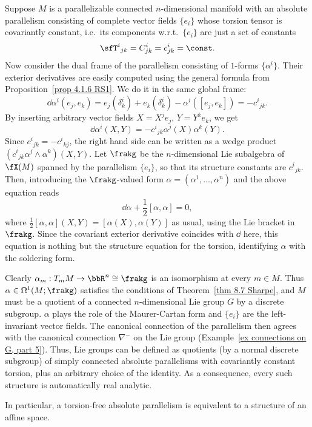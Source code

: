 \begin{example}
    Suppose $M$ is a parallelizable connected $n$-dimensional manifold with an absolute parallelism consisting of complete vector fields $\{e_i\}$ whose torsion tensor is covariantly constant, i.e.\ its components w.r.t.\ $\{e_i\}$ are just a set of constants
    \[\sfT^i{}_{jk}=C^i_{jk}=c^i_{jk}=\const.\]
    Now consider the dual frame of the parallelism consisting of $1$-forms  $\{\alpha^i\}$. Their exterior derivatives are easily computed using the general formula from Proposition~\ref{prop 4.1.6 RS1}. We do it in the same global frame:
    \[\dd\alpha^i(e_j,e_k)=e_j(\delta^i_k)+e_k(\delta^i_k)-\alpha^i([e_j,e_k])=-c^i{}_{jk}.\]
    By inserting arbitrary vector fields $X=X^j e_j$, $Y=Y^k e_k$, we get 
    \[\dd\alpha^i(X,Y)=-c^i{}_{jk}\alpha^j(X)\alpha^k(Y).\]
    Since $c^i{}_{jk}=-c^i{}_{kj}$, the right hand side can be written as a wedge product $(c^i{}_{jk}\alpha^j\wedge\alpha^k)(X,Y)$. Let $\frakg$ be the $n$-dimensional Lie subalgebra of $\fX(M)$ spanned by the parallelism $\{e_i\}$, so that its structure constants are $c^i{}_{jk}$. Then, introducing the $\frakg$-valued form $\alpha=(\alpha^1,\ldots,\alpha^n)$ and the above equation reads 
    \[\dd\alpha +\frac12[\alpha,\alpha]=0,\]
    where $\frac12[\alpha,\alpha](X,Y)=[\alpha(X),\alpha(Y)]$ as usual, using the Lie bracket in $\frakg$. Since the covariant exterior derivative coincides with $\dd$ here, this equation is nothing but the structure equation for the torsion, identifying $\alpha$ with the soldering form.

    Clearly $\alpha_m:T_mM\to \bbR^n\cong\frakg$ is an isomorphism at every $m\in M$. Thus $\alpha\in\Omega^1(M;\frakg)$ satisfies the conditions of Theorem~\ref{thm 8.7 Sharpe}, and $M$ must be a quotient of a connected $n$-dimensional Lie group $G$ by a discrete subgroup. $\alpha$ plays the role of the Maurer-Cartan form and $\{e_i\}$ are the left-invariant vector fields. The canonical connection of the parallelism then agrees with the canonical connection $\nabla^-$ on the Lie group (Example~\ref{ex connections on G, part 5}). Thus, Lie groups can be defined as quotients (by a normal discrete subgroup) of simply connected absolute parallelisms with covariantly constant torsion, plus an arbitrary choice of the identity. As a consequence, every such structure is automatically real analytic.

    In particular, a torsion-free absolute parallelism is equivalent to a structure of an affine space.
\end{example}


